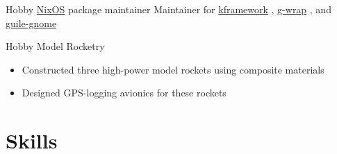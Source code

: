 \documentclass[10pt,letterpaper,sans]{moderncv}
\newcommand{\wlink}[2]{\textcolor[HTML]{0071E6}{\href{#1}{#2}}}
\newcommand{\nixpkg}[2]{%
  \wlink{https://github.com/NixOS/nixpkgs/tree/master/pkgs/#1/#2/default.nix}%
        {#2}%
}
\begin{document}
        {Hobby}
        {\wlink{http://nixos.org}{NixOS} package maintainer}
        {}{}{
Maintainer for %
\nixpkg{applications/science/programming}{kframework}, %
\nixpkg{development/tools/guile}{g-wrap}, and %
\nixpkg{development/tools/guile-modules}{guile-gnome}%
}

        {Hobby}
        {Model Rocketry}
        {}{}{
  \begin{itemize}
  \item Constructed three high-power model rockets using composite materials
  \item Designed GPS-logging avionics for these rockets
  \end{itemize}
}

\section{Skills}

\newpage
\end{document}
